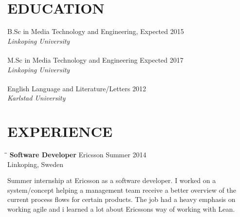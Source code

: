 \documentclass{res}
\begin{document}
 


\address{\bf  PRESENT ADDRESS\\Skomakaregatan 9\\602 32 Norrkoping, Sweden\\
+46 727 273125}
\address{\bf ADDITIONAL INFORMATION \\ Github: CarlEnglund \\ Mail: mail@carlenglund.se
\\ Website: www.carlenglund.se}

                                  
\begin{resume}
          
\section{EDUCATION}                
    B.Sc in Media Technology and Engineering, Expected 2015   \\
    \emph{Linkoping University} \\      
    \\ M.Sc in Media Technology and Engineering Expected 2017\\\emph{Linkoping University} \\  
    \\ English Language and Literature/Letters 2012\\\emph{Karlstad University} \\          
       

 
\section{EXPERIENCE}
   \vspace{-0.1in}	
   \begin{tabbing}
   \hspace{2.3in}\= \hspace{2.6in}\= \kill %
    {\bf Software Developer} \>Ericsson     \>Summer 2014\\
                             \>Linkoping, Sweden
   \end{tabbing}\vspace{-20pt}      %
    Summer internship at Ericsson as a software developer. I worked on a system/concept helping a management team receive a better overview of the current process flows for certain products. The job had a heavy emphasis on working agile and i learned a lot about Ericssons way of working with Lean.


\end{resume}
\end{document}
